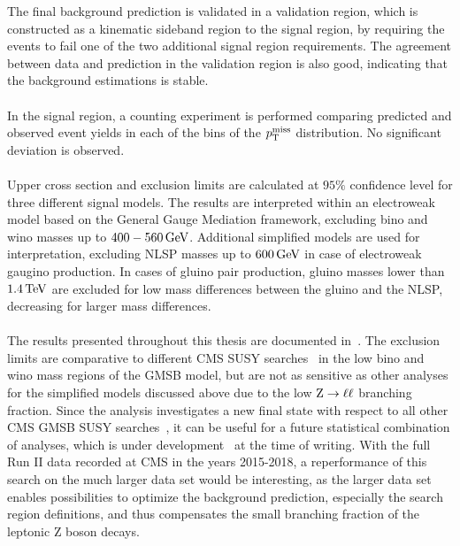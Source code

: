 The final background prediction is validated in a validation region, which is constructed as a kinematic sideband region to the signal region, by requiring the events to fail one of the two additional signal region requirements. The agreement between data and prediction in the validation region is also good, indicating that the background estimations is stable.\\\\
In the signal region, a counting experiment is performed comparing predicted and observed event yields in each of the bins of the $p_{\mathrm{T}}^\text{miss}$ distribution. No significant deviation is observed.\\\\
Upper cross section and exclusion limits are calculated at $95\%$ confidence level for three different signal models. The results are interpreted within an electroweak model based on the General Gauge Mediation framework, excluding bino and wino masses up to $400-560\,\text{Ge\hspace{-.08em}V}$. Additional simplified models are used for interpretation, excluding NLSP masses up to $600\,\text{Ge\hspace{-.08em}V}$ in case of electroweak gaugino production. In cases of gluino pair production, gluino masses lower than $1.4\,\text{Te\hspace{-.08em}V}$ are excluded for low mass differences between the gluino and the NLSP, decreasing for larger mass differences.\\\\
The results presented throughout this thesis are documented in~\cite{MyAN}. The exclusion limits are comparative to different CMS SUSY searches~\cite{PhotonMet} in the low bino and wino mass regions of the GMSB model, but are not as sensitive as other analyses for the simplified models discussed above due to the low $\mathrm{Z}\to\ell\ell$ branching fraction. Since the analysis investigates a new final state with respect to all other CMS GMSB SUSY searches~\cite{PhotonMet,PhotonHT,PhotonBJet}, it can be useful for a future statistical combination of analyses, which is under development~\cite{Danilo} at the time of writing. With the full Run II data recorded at CMS in the years 2015-2018, a reperformance of this search on the much larger data set would be interesting, as the larger data set enables possibilities to optimize the background prediction, especially the search region definitions, and thus compensates the small branching fraction of the leptonic Z boson decays.

